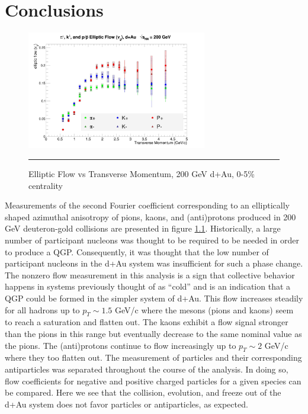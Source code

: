 
\chapter{Conclusions} %

\begin{figure}[hbtp]

\centering
    \includegraphics[width=0.7\textwidth]{results/v2all.jpg}
    \rule{35em}{0.5pt}
    \caption[Elliptic Flow vs Transverse Momentum, 200 GeV d+Au, 0-5\% centrality]{Elliptic Flow vs Transverse Momentum, 200 GeV d+Au, 0-5\% centrality}
    \label{fig:v2main}
\end{figure}

Measurements of the second Fourier coefficient corresponding to an elliptically shaped azimuthal anisotropy of pions, kaons, and (anti)protons produced in 200 GeV deuteron-gold collisions are presented in figure \ref{fig:v2main}. Historically, a large number of participant nucleons was thought to be required to be needed in order to produce a QGP. Consequently, it was thought that the low number of participant nucleons in the d+Au system was insufficient for such a phase change. The nonzero flow measurement in this analysis is a sign that collective behavior happens in systems previously thought of as ``cold'' and is an indication that a QGP could be formed in the simpler system of d+Au. This flow increases steadily for all hadrons up to $p_T \sim 1.5 $ GeV/c where the mesons (pions and kaons) seem to reach a saturation and flatten out. The kaons exhibit a flow signal stronger than the pions in this range but eventually decrease to the same nominal value as the pions. The (anti)protons continue to flow increasingly up to $p_T \sim 2$ GeV/c where they too flatten out. The measurement of particles and their corresponding antiparticles was separated throughout the course of the analysis. In doing so, flow coefficients for negative and positive charged particles for a given species can be compared. Here we see that the collision, evolution, and freeze out of the d+Au system does not favor particles or antiparticles, as expected.

